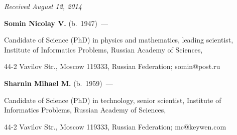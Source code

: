 





\hfill{\small\textit{Received August 12, 2014}}






\Contr



\noindent

\textbf{Somin Nicolay V.} (b.\ 1947)~---

 Candidate of Science (PhD) in physics and mathematics, leading scientist, Institute of Informatics Problems, Russian Academy of Sciences,

44-2 Vavilov Str., Moscow 119333, Russian Federation;  somin@post.ru



\vspace*{3pt}



\noindent

\textbf{Sharnin Mihael M.} (b.\ 1959)~---

Candidate of Science (PhD) in technology, senior scientist, Institute of Informatics Problems, Russian Academy of Sciences,

44-2 Vavilov Str., Moscow 119333, Russian Federation;  mc@keywen.com





\label{end\stat}



\renewcommand{\bibname}{\protect\rm Литература}







